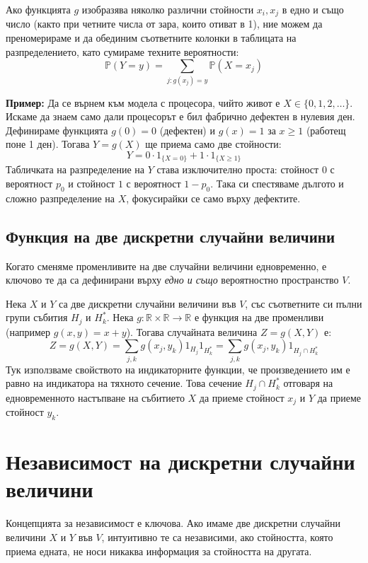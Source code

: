 \documentclass{article}
\begin{document}
Ако функцията $g$ изобразява няколко различни стойности $x_i, x_j$ в едно и също число (както при четните числа от зара, които отиват в 1), ние можем да преномерираме и да обединим съответните колонки в таблицата на разпределението, като сумираме техните вероятности:
\[ \mathbb{P}(Y = y) = \sum_{j : g(x_j) = y} \mathbb{P}(X = x_j) \]

\textbf{Пример:} Да се върнем към модела с процесора, чийто живот е $X \in \{0, 1, 2, \dots\}$. Искаме да знаем само дали процесорът е бил фабрично дефектен в нулевия ден. Дефинираме функцията $g(0) = 0$ (дефектен) и $g(x) = 1$ за $x \ge 1$ (работещ поне 1 ден). Тогава $Y = g(X)$ ще приема само две стойности:
\[ Y = 0 \cdot 1_{\{X=0\}} + 1 \cdot 1_{\{X \ge 1\}} \]
Табличката на разпределение на $Y$ става изключително проста: стойност $0$ с вероятност $p_0$ и стойност $1$ с вероятност $1 - p_0$. Така си спестяваме дългото и сложно разпределение на $X$, фокусирайки се само върху дефектите.

\subsection{Функция на две дискретни случайни величини}
Когато сменяме променливите на две случайни величини едновременно, е ключово те да са дефинирани върху \textit{едно и също} вероятностно пространство $V$. 

Нека $X$ и $Y$ са две дискретни случайни величини във $V$, със съответните си пълни групи събития $H_j$ и $H_k^*$. Нека $g: \mathbb{R} \times \mathbb{R} \rightarrow \mathbb{R}$ е функция на две променливи (например $g(x,y) = x+y$). Тогава случайната величина $Z = g(X, Y)$ е:
\[ Z = g(X, Y) = \sum_{j, k} g(x_j, y_k) 1_{H_j} 1_{H_k^*} = \sum_{j, k} g(x_j, y_k) 1_{H_j \cap H_k^*} \]
Тук използваме свойството на индикаторните функции, че произведението им е равно на индикатора на тяхното сечение. Това сечение $H_j \cap H_k^*$ отговаря на едновременното настъпване на събитието $X$ да приеме стойност $x_j$ и $Y$ да приеме стойност $y_k$.

\section{Независимост на дискретни случайни величини}

Концепцията за независимост е ключова. Ако имаме две дискретни случайни величини $X$ и $Y$ във $V$, интуитивно те са независими, ако стойността, която приема едната, не носи никаква информация за стойността на другата.
\end{document}

